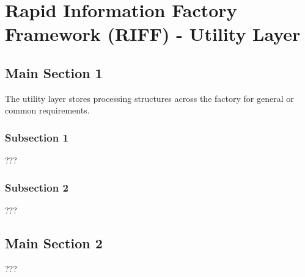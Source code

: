 
\chapter{Rapid Information Factory Framework (RIFF) - Utility Layer} %

\label{Chapter37} %



\section{Main Section 1}

The utility layer stores processing structures across the factory for general or common requirements.

\subsection{Subsection 1}

???


\subsection{Subsection 2}

???


\section{Main Section 2}

???
